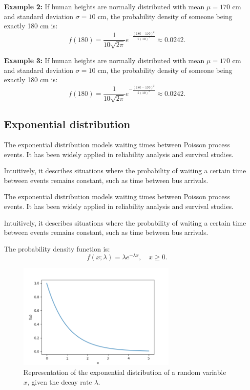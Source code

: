 \documentclass{book}
\begin{document}
\textbf{Example 2:} If human heights are normally distributed with mean $\mu=170$ cm and standard deviation $\sigma=10$ cm, the probability density of someone being exactly 180 cm is:
\begin{equation}
    f(180) = \frac{1}{10 \sqrt{2\pi}} e^{-\frac{(180-170)^2}{2(10)^2}} \approx 0.0242.
\end{equation}

\textbf{Example 3:} If human heights are normally distributed with mean $\mu=170$ cm and standard deviation $\sigma=10$ cm, the probability density of someone being exactly 180 cm is:
\begin{equation}
    f(180) = \frac{1}{10 \sqrt{2\pi}} e^{-\frac{(180-170)^2}{2(10)^2}} \approx 0.0242.
\end{equation}

\newpage
\subsection{Exponential distribution}
The exponential distribution models waiting times between Poisson process events. It has been widely applied in reliability analysis and survival studies.

Intuitively, it describes situations where the probability of waiting a certain time between events remains constant, such as time between bus arrivals.

The exponential distribution models waiting times between Poisson process events. It has been widely applied in reliability analysis and survival studies.

Intuitively, it describes situations where the probability of waiting a certain time between events remains constant, such as time between bus arrivals.

The probability density function is:
\begin{equation}
    f(x; \lambda) = \lambda e^{-\lambda x}, \quad x \geq 0.
\end{equation}

\begin{figure}[ht]
    \centering
    \includegraphics[width=0.7\textwidth]{figures/chapter2/exponential.png}
    \caption{Representation of the exponential distribution of a random variable $x$, given the decay rate $\lambda$.}
    \label{fig:random}
\end{figure}
\end{document}
